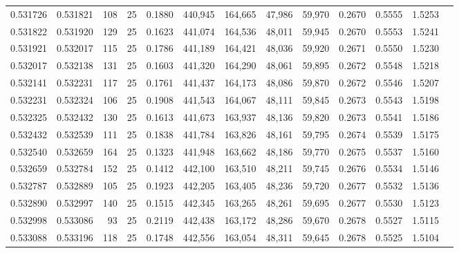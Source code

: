 \begin{tabular}{rrrrrrrrrrrrr}
0.531726 & 0.531821 &   108 &  25 &                                     0.1880 & 440,945 & 164,665 &  47,986 &  59,970 & 0.2670 & 0.5555 & 1.5253 \\
0.531822 & 0.531920 &   129 &  25 &                                     0.1623 & 441,074 & 164,536 &  48,011 &  59,945 & 0.2670 & 0.5553 & 1.5241 \\
0.531921 & 0.532017 &   115 &  25 &                                     0.1786 & 441,189 & 164,421 &  48,036 &  59,920 & 0.2671 & 0.5550 & 1.5230 \\
0.532017 & 0.532138 &   131 &  25 &                                     0.1603 & 441,320 & 164,290 &  48,061 &  59,895 & 0.2672 & 0.5548 & 1.5218 \\
0.532141 & 0.532231 &   117 &  25 &                                     0.1761 & 441,437 & 164,173 &  48,086 &  59,870 & 0.2672 & 0.5546 & 1.5207 \\
0.532231 & 0.532324 &   106 &  25 &                                     0.1908 & 441,543 & 164,067 &  48,111 &  59,845 & 0.2673 & 0.5543 & 1.5198 \\
0.532325 & 0.532432 &   130 &  25 &                                     0.1613 & 441,673 & 163,937 &  48,136 &  59,820 & 0.2673 & 0.5541 & 1.5186 \\
0.532432 & 0.532539 &   111 &  25 &                                     0.1838 & 441,784 & 163,826 &  48,161 &  59,795 & 0.2674 & 0.5539 & 1.5175 \\
0.532540 & 0.532659 &   164 &  25 &                                     0.1323 & 441,948 & 163,662 &  48,186 &  59,770 & 0.2675 & 0.5537 & 1.5160 \\
0.532659 & 0.532784 &   152 &  25 &                                     0.1412 & 442,100 & 163,510 &  48,211 &  59,745 & 0.2676 & 0.5534 & 1.5146 \\
0.532787 & 0.532889 &   105 &  25 &                                     0.1923 & 442,205 & 163,405 &  48,236 &  59,720 & 0.2677 & 0.5532 & 1.5136 \\
0.532890 & 0.532997 &   140 &  25 &                                     0.1515 & 442,345 & 163,265 &  48,261 &  59,695 & 0.2677 & 0.5530 & 1.5123 \\
0.532998 & 0.533086 &    93 &  25 &                                     0.2119 & 442,438 & 163,172 &  48,286 &  59,670 & 0.2678 & 0.5527 & 1.5115 \\
0.533088 & 0.533196 &   118 &  25 &                                     0.1748 & 442,556 & 163,054 &  48,311 &  59,645 & 0.2678 & 0.5525 & 1.5104 \\

\end{tabular}
